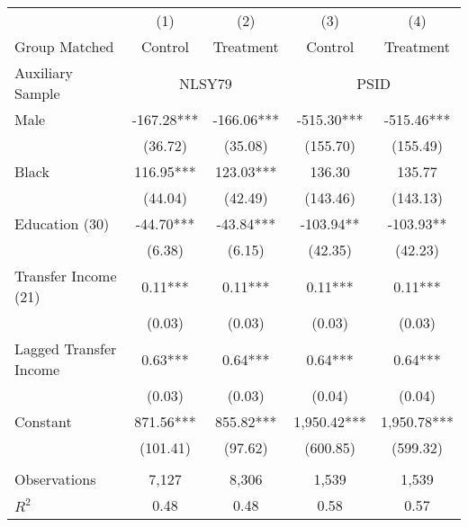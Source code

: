 \begin{tabular}{lcccc} \toprule
 & (1) & (2) & (3) & (4)  \\
Group Matched   & Control & Treatment & Control & Treatment \\ 
Auxiliary Sample & \multicolumn{2}{c}{NLSY79} & \multicolumn{2}{c}{PSID}  \\  \midrule 
Male & -167.28*** & -166.06*** & -515.30*** & -515.46*** \\
 & (36.72) & (35.08) & (155.70) & (155.49) \\
Black & 116.95*** & 123.03*** & 136.30 & 135.77 \\
 & (44.04) & (42.49) & (143.46) & (143.13) \\
Education (30) & -44.70*** & -43.84*** & -103.94** & -103.93** \\
 & (6.38) & (6.15) & (42.35) & (42.23) \\
Transfer Income (21)& 0.11*** & 0.11*** & 0.11*** & 0.11*** \\
 & (0.03) & (0.03) & (0.03) & (0.03) \\
Lagged Transfer Income & 0.63*** & 0.64*** & 0.64*** & 0.64*** \\
 & (0.03) & (0.03) & (0.04) & (0.04) \\
Constant & 871.56*** & 855.82*** & 1,950.42*** & 1,950.78*** \\
 & (101.41) & (97.62) & (600.85) & (599.32) \\ \\ \midrule
Observations & 7,127 & 8,306 & 1,539 & 1,539 \\
$R^2$  & 0.48 & 0.48 & 0.58 & 0.57 \\ \bottomrule
\end{tabular}
